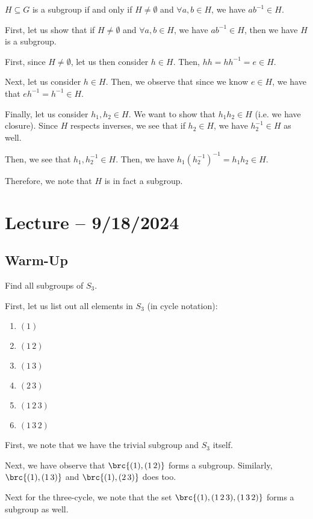 \documentclass[openany]{book}
\begin{document}
\begin{prop}
	$H \subseteq G$ is a subgroup if and only if $H \neq \emptyset$ and $\forall a, b \in H$, we have $ab^{-1} \in H$.
\end{prop}
\begin{solution}
	First, let us show that if $H \neq \emptyset$ and $\forall a,b \in H$, we have $ab^{-1} \in H$, then we have $H$ is a subgroup.
	\begin{innerproof}
		First, since $H \neq \emptyset$, let us then consider $h \in H$. Then, $hh = hh^{-1} = e \in H$.
		
		Next, let us consider $h \in H$. Then, we observe that since we know $e \in H$, we have that $eh^{-1} = h^{-1} \in H$.
		
		Finally, let us consider $h_1, h_2 \in H$. We want to show that $h_1 h_2 \in H$ (i.e. we have closure). Since $H$ respects inverses, we see that if $h_2 \in H$, we have $h_2^{-1} \in H$ as well.
		
		Then, we see that $h_1, h_2^{-1} \in H$. Then, we have $h_1(h_2^{-1})^{-1} = h_1h_2\in H$.
		
		Therefore, we note that $H$ is in fact a subgroup.
	\end{innerproof}
\end{solution}

\section{Lecture -- 9/18/2024}
\subsection{Warm-Up}
\begin{hw}
	Find all subgroups of $S_3$.
\end{hw}
\begin{solution}
	First, let us list out all elements in $S_3$ (in cycle notation):
	\begin{enumerate}
		\item $(1)$
		\item $(1\,2)$
		\item $(1\,3)$
		\item $(2\,3)$
		\item $(1\,2\,3)$
		\item $(1\,3\,2)$
	\end{enumerate}
	
	First, we note that we have the trivial subgroup and $S_3$ itself.
	
	Next, we have observe that $\brc{(1), (1\,2)}$ forms a subgroup. Similarly, $\brc{(1), (1\,3)}$ and $\brc{(1), (2\,3)}$ does too.
	
	Next for the three-cycle, we note that the set $\brc{(1), (1\,2\,3), (1\,3\,2)}$ forms a subgroup as well.
\end{solution}
\end{document}
